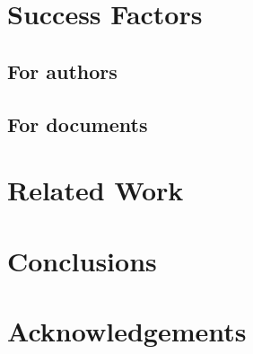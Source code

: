 \documentclass[twocolumn,10pt]{article}
\begin{document}
\section{Success Factors}

\subsection{For authors}



\subsection{For documents}


\section{Related Work}

%
%



\section{Conclusions}



\section*{Acknowledgements}
\end{document}
